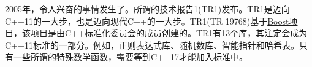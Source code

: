 

2005年，令人兴奋的事情发生了。所谓的技术报告1(TR1)发布。TR1是迈向C++11的一大步，也是迈向现代C++的一大步。TR1(TR 19768)基于\href{https://www.boost.org/}{Boost项目}，该项目是由C++标准化委员会的成员创建的。TR1有13个库，其注定会成为C++11标准的一部分。例如，正则表达式库、随机数库、智能指针和哈希表。只有一些所谓的特殊数学函数，需要等到C++17才能加入标准中。